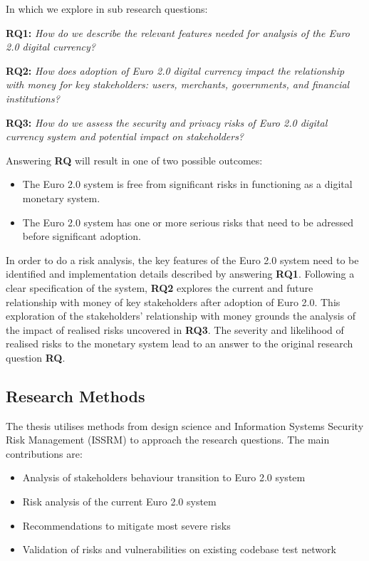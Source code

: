\documentclass[12pt]{article} %
\begin{document}
In which we explore in sub research questions:
\begin{quoting}
\textbf{RQ1: }\textit{How do we describe the relevant features needed for analysis of the Euro 2.0 digital currency?}
\end{quoting}
\begin{quoting}
\textbf{RQ2: }\textit{How does adoption of Euro 2.0 digital currency impact the relationship with money for key stakeholders: users, merchants, governments, and financial institutions?}
\end{quoting}
\begin{quoting}
\textbf{RQ3: }\textit{How do we assess the security and privacy risks of Euro 2.0 digital currency system and potential impact on stakeholders?}
\end{quoting}

Answering \textbf{RQ} will result in one of two possible outcomes:
\begin{itemize}
	\item The Euro 2.0 system is free from significant risks in functioning as a digital monetary system.
	\item The Euro 2.0 system has one or more serious risks that need to be adressed before significant adoption.
\end{itemize}
In order to do a risk analysis, the key features of the Euro 2.0 system need to be identified and implementation details described by answering \textbf{RQ1}. Following a clear specification of the system, \textbf{RQ2} explores the current and future relationship with money of key stakeholders after adoption of Euro 2.0. This exploration of the stakeholders' relationship with money grounds the analysis of the impact of realised risks uncovered in \textbf{RQ3}. The severity and likelihood of realised risks to the monetary system lead to an answer to the original research question \textbf{RQ}.

\subsection{Research Methods} \label{ssec:1.3}
The thesis utilises methods from design science and Information Systems Security Risk Management (ISSRM) to approach the research questions. The main contributions are:
\begin{itemize}
	\item Analysis of stakeholders behaviour transition to Euro 2.0 system
	\item Risk analysis of the current Euro 2.0 system
	\item Recommendations to mitigate most severe risks
	\item Validation of risks and vulnerabilities on existing codebase test network
\end{itemize}
\end{document}
